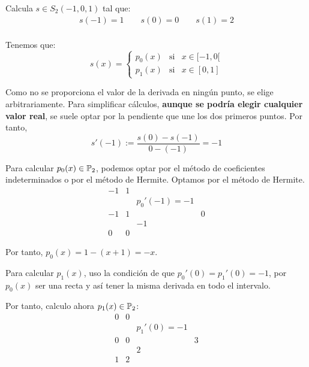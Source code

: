 \begin{ejemplo}
    Calcula $s\in S_2(-1, 0, 1)$ tal que:
    \begin{gather*}
        s(-1)=1 \qquad s(0)=0 \qquad s(1)=2 \\
    \end{gather*}

    Tenemos que:
    \begin{equation*}
        s(x)=\left\{\begin{array}{ccl}
            p_0(x) & \text{si} & x\in [-1, 0[ \\
            p_{1}(x) & \text{si} & x\in [0,1]
        \end{array} \right.
    \end{equation*}

    Como no se proporciona el valor de la derivada en ningún punto, se elige arbitrariamente. Para simplificar cálculos, \textbf{aunque se podría elegir cualquier valor real}, se suele optar por la pendiente que une los dos primeros puntos. Por tanto,
    \begin{equation*}
        s'(-1) := \frac{s(0)-s(-1)}{0-(-1)}= -1
    \end{equation*}

    Para calcular $p_0(x)\in \mathbb{P}_2$, podemos optar por el método de coeficientes indeterminados o por el método de Hermite. Optamos por el método de Hermite.
    \begin{equation*}
        \begin{array}{c|ccccc}
            -1 & 1 \\
            && p_0'(-1)=-1 \\ 
            -1 & 1 && 0\\
            && -1\\
            0 & 0
        \end{array}
    \end{equation*}

    Por tanto, $p_0(x)=1-(x+1)=-x$.

    Para calcular $p_1(x)$, uso la condición de que $p_0'(0)=p_1'(0)=-1$, por $p_0(x)$ ser una recta y así tener la misma derivada en todo el intervalo.

    Por tanto, calculo ahora $p_1(x)\in \mathbb{P}_2$:
    \begin{equation*}
        \begin{array}{c|ccccc}
            0 & 0 \\
            && p_1'(0)=-1 \\ 
            0 & 0 && 3\\
            && 2\\
            1 & 2
        \end{array}
    \end{equation*}


\end{ejemplo}
